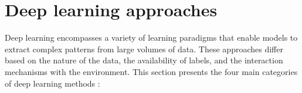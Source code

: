     
    



\section{Deep learning approaches}

Deep learning encompasses a variety of learning paradigms that enable models to extract complex patterns from large volumes of data. These approaches differ based on the nature of the data, the availability of labels, and the interaction mechanisms with the environment. This section presents the four main categories of deep learning methods \parencite{alzubaidi2021review}:

